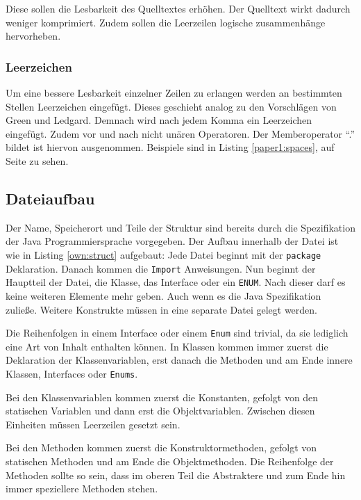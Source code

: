 Diese sollen die Lesbarkeit des Quelltextes erhöhen. Der Quelltext wirkt dadurch weniger komprimiert. Zudem sollen die Leerzeilen logische zusammenhänge hervorheben.

\subsubsection{Leerzeichen}

Um eine bessere Lesbarkeit einzelner Zeilen zu erlangen werden an bestimmten Stellen Leerzeichen eingefügt. Dieses geschieht analog zu den Vorschlägen von Green und Ledgard\cite[S. 7]{Green}. Demnach wird nach jedem Komma ein Leerzeichen eingefügt. Zudem vor und nach nicht unären Operatoren. Der Memberoperator \enquote{.} bildet ist hiervon ausgenommen. Beispiele sind in Listing \ref{paper1:spaces}, auf Seite \pageref{paper1:spaces} zu sehen.

\subsection{Dateiaufbau}
Der Name, Speicherort und Teile der Struktur sind bereits durch die Spezifikation der Java Programmiersprache vorgegeben. Der Aufbau innerhalb der Datei ist wie in Listing \ref{own:struct}  aufgebaut: Jede Datei beginnt mit der \texttt{package} Deklaration. Danach kommen die \texttt{Import} Anweisungen. Nun beginnt der Hauptteil der Datei, die Klasse, das Interface oder ein \texttt{ENUM}. Nach dieser darf es keine weiteren Elemente mehr geben. Auch wenn es die Java Spezifikation zuließe. Weitere Konstrukte müssen in eine separate Datei gelegt werden.

Die Reihenfolgen in einem Interface oder einem \texttt{Enum} sind trivial, da sie lediglich eine Art von Inhalt enthalten können. In Klassen kommen immer zuerst die Deklaration der Klassenvariablen, erst danach die Methoden und am Ende innere Klassen, Interfaces oder \texttt{Enums}.

Bei den Klassenvariablen kommen zuerst die Konstanten, gefolgt von den statischen Variablen und dann erst die Objektvariablen. Zwischen diesen Einheiten müssen Leerzeilen gesetzt sein.

Bei den Methoden kommen zuerst die Konstruktormethoden, gefolgt von statischen Methoden und am Ende die Objektmethoden. Die Reihenfolge der Methoden sollte so sein, dass im oberen Teil die Abstraktere und zum Ende hin immer speziellere Methoden stehen.

